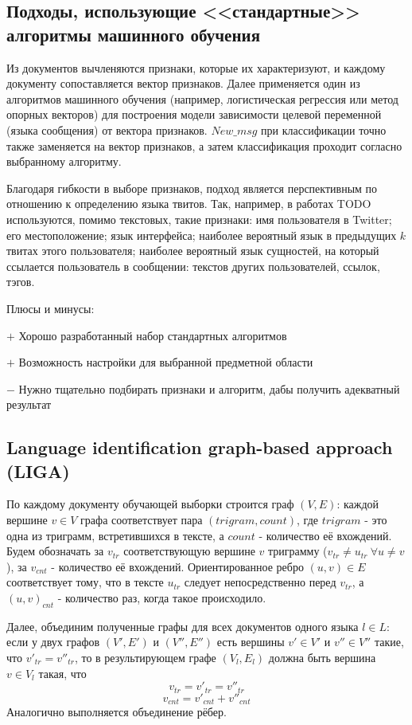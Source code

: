 \documentclass[a4paper, 14pt]{article}
\begin{document}
		\subsection{Подходы, использующие <<стандартные>> алгоритмы машинного обучения}
		Из документов вычленяются признаки, которые их характеризуют, и каждому документу сопоставляется вектор признаков. Далее применяется
		один из алгоритмов машинного обучения (например, логистическая регрессия или метод опорных векторов) для построения модели зависимости
		целевой переменной (языка сообщения) от вектора признаков. $New\_msg$ при классификации точно также заменяется на вектор признаков,
		а затем классификация проходит согласно выбранному алгоритму.
		
		Благодаря гибкости в выборе признаков, подход является перспективным по отношению к определению языка твитов. Так, например, в работах TODO
		используются, помимо текстовых, такие признаки: имя пользователя в Twitter; его местоположение; язык интерфейса; наиболее вероятный
		язык в предыдущих $k$ твитах этого пользователя; наиболее вероятный язык сущностей, на который ссылается пользователь в сообщении: текстов
		других пользователей, ссылок, тэгов.
		
		\noindent Плюсы и минусы:
		
		$+$ Хорошо разработанный набор стандартных алгоритмов
		
		$+$ Возможность настройки для выбранной предметной области
		
		$-$ Нужно тщательно подбирать признаки и алгоритм, дабы получить адекватный результат
		
		\subsection{Language identification graph-based approach (LIGA)}
		По каждому документу обучающей выборки строится граф $(V, E)$:
		 каждой вершине $v \in V$ графа соответствует пара $(trigram, count)$, где $trigram$ - это одна
		из триграмм, встретившихся в тексте, а $count$ - количество её вхождений. Будем обозначать за $v_{tr}$ соответствующую вершине $v$ триграмму
		($v_{tr} \neq u_{tr} \ \forall u \neq v$), за $v_{cnt}$ - количество её вхождений. 
		Ориентированное ребро $(u, v) \in E$ соответствует тому, что в тексте $u_{tr}$ следует непосредственно
		перед $v_{tr}$, а $(u, v)_{cnt}$ - количество раз, когда такое происходило.
		
		Далее, объединим полученные графы для всех документов одного языка $l \in L$: если у двух графов $(V', E')$ и $(V'', E'')$ есть вершины
		$v' \in V'$ и $v'' \in V''$ такие, что $v'_{tr} = v''_{tr}$, то в результирующем графе $(V_{l}, E_{l})$ должна быть вершина 
		$v \in V_{l}$ такая, что 
		$$v_{tr} = v'_{tr} = v''_{tr}$$ $$v_{cnt} = v'_{cnt} + v''_{cnt}$$
		Аналогично выполняется объединение рёбер.
		
\end{document}
